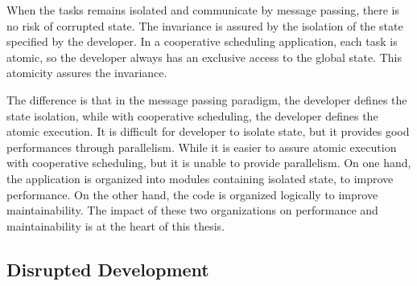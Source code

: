 When the tasks remains isolated and communicate by message passing, there is no risk of corrupted state.
The invariance is assured by the isolation of the state specified by the developer.
In a cooperative scheduling application, each task is atomic, so the developer always has an exclusive access to the global state.
This atomicity assures the invariance.


The difference is that in the message passing paradigm, the developer defines the state isolation, while with cooperative scheduling, the developer defines the atomic execution.
It is difficult for developer to isolate state, but it provides good performances through parallelism.
While it is easier to assure atomic execution with cooperative scheduling, but it is unable to provide parallelism.
On one hand, the application is organized into modules containing isolated state, to improve performance.
On the other hand, the code is organized logically to improve maintainability.
The impact of these two organizations on performance and maintainability is at the heart of this thesis.

\subsection{Disrupted Development}


